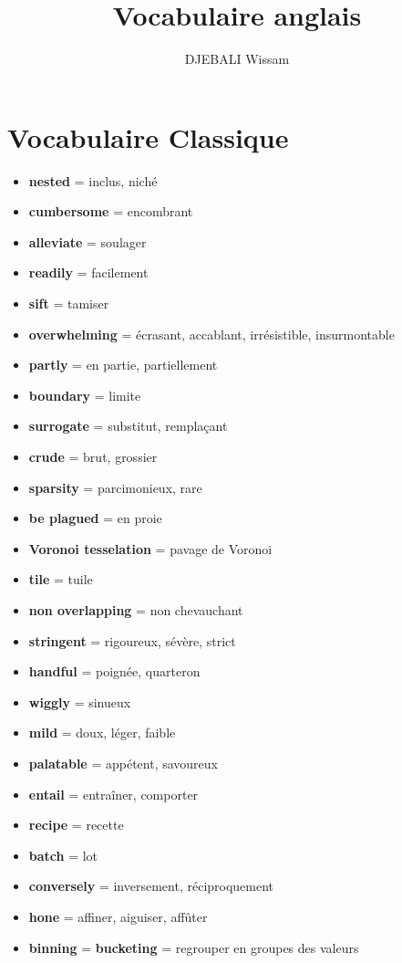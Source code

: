 \documentclass[french]{article}
\title{Vocabulaire anglais}
\author{DJEBALI Wissam}
\begin{document}
	\maketitle


\section{Vocabulaire Classique}
\begin{itemize}[label=\textbullet]
	\item \textbf{nested} = inclus, niché
	\item \textbf{cumbersome} = encombrant 
	\item \textbf{alleviate} = soulager
	\item \textbf{readily} = facilement
	\item \textbf{sift} = tamiser
	\item \textbf{overwhelming} = écrasant, accablant, irrésistible, insurmontable
	\item \textbf{partly} = en partie, partiellement
	\item \textbf{boundary} = limite
	\item \textbf{surrogate} = substitut, remplaçant
	\item \textbf{crude} = brut, grossier
	\item \textbf{sparsity} = parcimonieux, rare
	\item \textbf{be plagued} = en proie
	\item \textbf{Voronoi tesselation} = pavage de Voronoi
	\item \textbf{tile} = tuile
	\item \textbf{non overlapping} = non chevauchant
	\item \textbf{stringent} = rigoureux, sévère, strict
	\item \textbf{handful} = poignée, quarteron
	\item \textbf{wiggly} = sinueux
	\item \textbf{mild} = doux, léger, faible
	\item \textbf{palatable} = appétent, savoureux
	\item \textbf{entail} = entraîner, comporter
	\item \textbf{recipe} = recette
	\item \textbf{batch} = lot
	\item \textbf{conversely} = inversement, réciproquement
	\item \textbf{hone} = affiner, aiguiser, affûter
	\item \textbf{binning} = \textbf{bucketing} = regrouper en groupes des valeurs

\end{itemize}
\end{document}
